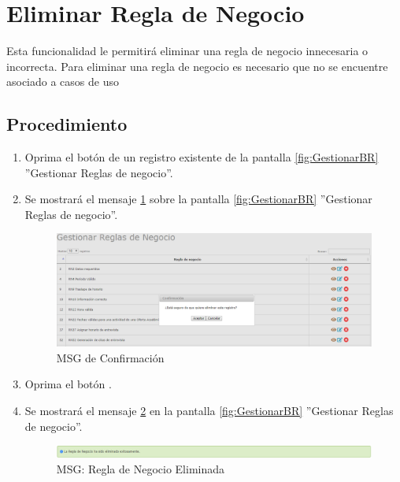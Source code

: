 \hypertarget{cv:eliminarBR}{\section{Eliminar Regla de Negocio}} \label{sec:eliminarBR}

	Esta funcionalidad le permitirá eliminar una regla de negocio innecesaria o incorrecta. Para eliminar una regla de negocio es necesario que no se encuentre asociado a casos de uso

		\subsection{Procedimiento}

			\begin{enumerate}
	
			\item Oprima el botón \IUBotonEliminar{} de un registro existente de la pantalla \ref{fig:GestionarBR} ''Gestionar Reglas de negocio''.
	
			\item Se mostrará el mensaje \ref{fig:confirmaEliminaBR} sobre la pantalla \ref{fig:GestionarBR} ''Gestionar Reglas de negocio''.
			
			\begin{figure}[htbp!]
				\begin{center}
					\includegraphics[scale=0.5]{roles/lider/reglasNegocio/pantallas/IU8-3MSG10}
					\caption{MSG de Confirmación}
					\label{fig:confirmaEliminaBR}
				\end{center}
			\end{figure}
						
			\item Oprima el botón \IUAceptar.
			
			\item Se mostrará el mensaje \ref{fig:BREliminada} en la pantalla \ref{fig:GestionarBR} ''Gestionar Reglas de negocio''.
			
			\begin{figure}[htbp!]
				\begin{center}
					\includegraphics[scale=0.5]{roles/lider/reglasNegocio/pantallas/IU8-3MSG1}
					\caption{MSG: Regla de Negocio Eliminada}
					\label{fig:BREliminada}
				\end{center}
			\end{figure}
			\end{enumerate}